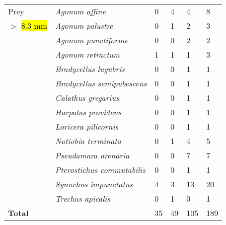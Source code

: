 \begin{table}[h]
\begin{tabular}{llllll}
                            \hline 
        Prey                & \textit{Agonum affine}                    & 0 & 4 & 4 & 8 \\ 
        $>$ \hl{8.3 mm}          & \textit{Agonum palustre}                  & 0 & 1 & 2 & 3 \\
                            & \textit{Agonum punctiforme}               & 0 & 0 & 2 & 2 \\ 
                            & \textit{Agonum retractum}                 & 1 & 1 & 1 & 3 \\ 
                            & \textit{Bradycellus lugubris}             & 0 & 0 & 1 & 1 \\
                            & \textit{Bradycellus semipubescens}        & 0 & 0 & 1 & 1 \\
                            & \textit{Calathus gregarius}               & 0 & 0 & 1 & 1 \\
                            & \textit{Harpalus providens}               & 0 & 0 & 1 & 1 \\
                            & \textit{Loricera pilicornis}              & 0 & 0 & 1 & 1 \\
                            & \textit{Notiobia terminata}               & 0 & 1 & 4 & 5 \\
                            & \textit{Pseudamara arenaria}              & 0 & 0 & 7 & 7 \\
                            & \textit{Pterostichus commutabilis}        & 0 & 0 & 1 & 1 \\
                            & \textit{Synuchus impunctatus}             & 4 & 3 & 13 & 20 \\
                            & \textit{Trechus apicalis}                 & 0 & 1 & 0 & 1 \\
                            \hline 
        \textbf{Total}      &                                           & 35 & 49 & 105 & 189 \\
        \hline
    \end{tabular}
  \end{table}

